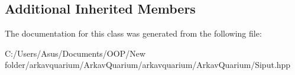 \subsection*{Additional Inherited Members}


The documentation for this class was generated from the following file\+:\begin{DoxyCompactItemize}
\item 
C\+:/\+Users/\+Asus/\+Documents/\+O\+O\+P/\+New folder/arkavquarium/\+Arkav\+Quarium/arkavquarium/\+Arkav\+Quarium/Siput.\+hpp\end{DoxyCompactItemize}
